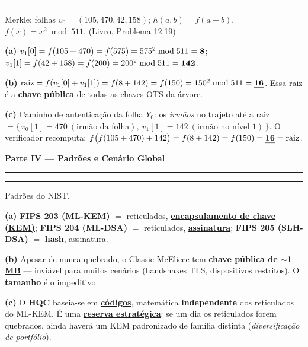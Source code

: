 \documentclass[11pt,a4paper]{article}
\newcommand{\livro}[1]{{\footnotesize\color{black!50}(Livro, Problema #1)}}
\newcommand{\alert}[1]{\textbf{\uline{#1}}}
\newcommand{\parte}[1]{%
    \par\vspace{1.6em}\noindent
    {\large\bfseries\color{red!55!black}#1}%
    \par\nobreak\vspace{-0.4em}\noindent
    {\color{red!45!black}\rule{\linewidth}{1.0pt}}%
    \par\nobreak\vspace{0.2em}
}
\newcommand{\exercicio}[1]{%
    \Needspace{8\baselineskip}%
    \par\vspace{1.2em}
    \noindent
    {\color{black!55}\rule[-0.25em]{3pt}{1.6em}}%
    \hspace{0.6em}{\Large\bfseries Exerc\'{i}cio #1}
    \par\vspace{-0.4em}
    \noindent{\color{black!35}\rule{\textwidth}{0.4pt}}
    \par\vspace{0.35em}
}
\newenvironment{resposta}{%
    \begin{respostabox}
    \color{red!70!black}\sloppy
}{%
    \end{respostabox}
}
\begin{document}
\exercicio{9}
Merkle: folhas $v_0=(105,470,42,158)$; $h(a,b)=f(a+b)$, $f(x)=x^2\bmod 511$. \livro{12.19}
\begin{resposta}
\textbf{(a)} $v_1[0]=f(105+470)=f(575)=575^2 \bmod 511 = \alert{8}$;\quad
$v_1[1]=f(42+158)=f(200)=200^2\bmod 511 = \alert{142}$.

\textbf{(b)} $\text{raiz}=f(v_1[0]+v_1[1])=f(8+142)=f(150)=150^2\bmod 511 = \alert{16}$. Essa raiz \'{e} a \textbf{chave p\'{u}blica} de todas as chaves OTS da \'{a}rvore.

\textbf{(c)} Caminho de autentica\c{c}\~{a}o da folha $Y_0$: os \emph{irm\~{a}os} no trajeto at\'{e} a raiz $= \{\,v_0[1]=470\ (\text{irm\~{a}o da folha}),\ v_1[1]=142\ (\text{irm\~{a}o no n\'{i}vel 1})\,\}$. O verificador recomputa: $f\big(f(105+470)+142\big) = f(8+142) = f(150) = \alert{16} = \text{raiz}$. \checkmark
\end{resposta}

\parte{Parte IV --- Padr\~{o}es e Cen\'{a}rio Global}

\exercicio{10}
Padr\~{o}es do NIST.\begin{resposta}
\textbf{(a)} \textbf{FIPS 203 (ML-KEM)} $=$ reticulados, \alert{encapsulamento de chave (KEM)}; \textbf{FIPS 204 (ML-DSA)} $=$ reticulados, \alert{assinatura}; \textbf{FIPS 205 (SLH-DSA)} $=$ \alert{hash}, assinatura.

\textbf{(b)} Apesar de nunca quebrado, o Classic McEliece tem \alert{chave p\'{u}blica de $\sim$1\,MB} --- invi\'{a}vel para muitos cen\'{a}rios (handshakes TLS, dispositivos restritos). O \textbf{tamanho} \'{e} o impeditivo.

\textbf{(c)} O \textbf{HQC} baseia-se em \alert{c\'{o}digos}, matem\'{a}tica \textbf{independente} dos reticulados do ML-KEM. \'{E} uma \alert{reserva estrat\'{e}gica}: se um dia os reticulados forem quebrados, ainda haver\'{a} um KEM padronizado de fam\'{i}lia distinta (\emph{diversifica\c{c}\~{a}o de portf\'{o}lio}).
\end{resposta}
\end{document}
